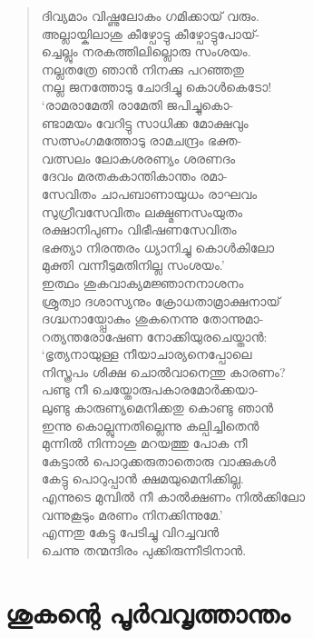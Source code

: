 \begin{verse}
ദിവ്യമാം വിഷ്ണുലോകം ഗമിക്കായ് വരും.\\
അല്ലായ്കിലാശു കീഴ്പോട്ടു കീഴ്പോട്ടുപോയ്-\\
ച്ചെല്ലും നരകത്തിലില്ലൊരു സംശയം.\\
നല്ലതത്രേ ഞാന്‍ നിനക്കു പറഞ്ഞതു\\
നല്ല ജനത്തോടു ചോദിച്ചു കൊള്‍കെടോ!\\
‘രാമരാമേതി രാമേതി ജപിച്ചുകൊ-\\
ണ്ടാമയം വേറിട്ടു സാധിക്ക മോക്ഷവും\\
സത്സംഗമത്തോടു രാമചന്ദ്രം ഭക്ത-\\
വത്സലം ലോകശരണ്യം ശരണദം\\
ദേവം മരതകകാന്തികാന്തം രമാ-\\
സേവിതം ചാപബാണായുധം രാഘവം\\
സുഗ്രീവസേവിതം ലക്ഷ്മണസംയുതം\\
രക്ഷാനിപുണം വിഭീഷണസേവിതം\\
ഭക്ത്യാ നിരന്തരം ധ്യാനിച്ചു കൊള്‍കിലോ\\
മുക്തി വന്നീടുമതിനില്ല സംശയം.’\\
ഇത്ഥം ശുകവാക്യമജ്ഞാനനാശനം\\
ശ്രുത്വാ ദശാസ്യനും ക്രോധതാമ്രാക്ഷനായ്\\
ദഗ്ദ്ധനായ്പ്പോകും ശുകനെന്നു തോന്നുമാ-\\
റത്യന്തരോഷേണ നോക്കിയുരചെയ്താന്‍:\\
‘ഭൃത്യനായുള്ള നീയാചാര്യനെപ്പോലെ\\
നിസ്ത്രപം ശിക്ഷ ചൊല്‍വാനെന്തു കാരണം?\\
പണ്ടു നീ ചെയ്തോരുപകാരമോര്‍ക്കയാ-\\
ലുണ്ടു കാരുണ്യമെനിക്കതു കൊണ്ടു ഞാന്‍\\
ഇന്നു കൊല്ലുന്നതില്ലെന്നു കല്പിച്ചിതെന്‍\\
മുന്നില്‍ നിന്നാശു മറയത്തു പോക നീ\\
കേട്ടാല്‍ പൊറുക്കരുതാതൊരു വാക്കുകള്‍\\
കേട്ടു പൊറുപ്പാന്‍ ക്ഷമയുമെനിക്കില്ല.\\
എന്നുടെ മുമ്പില്‍ നീ കാല്‍ക്ഷണം നില്‍ക്കിലോ\\
വന്നുകൂടും മരണം നിനക്കിന്നുമേ.’\\
എന്നതു കേട്ടു പേടിച്ചു വിറച്ചവന്‍\\
ചെന്നു തന്മന്ദിരം പുക്കിരുന്നീടിനാന്‍.
\end{verse}


\section{ശുകന്റെ പൂര്‍വവൃത്താന്തം}

